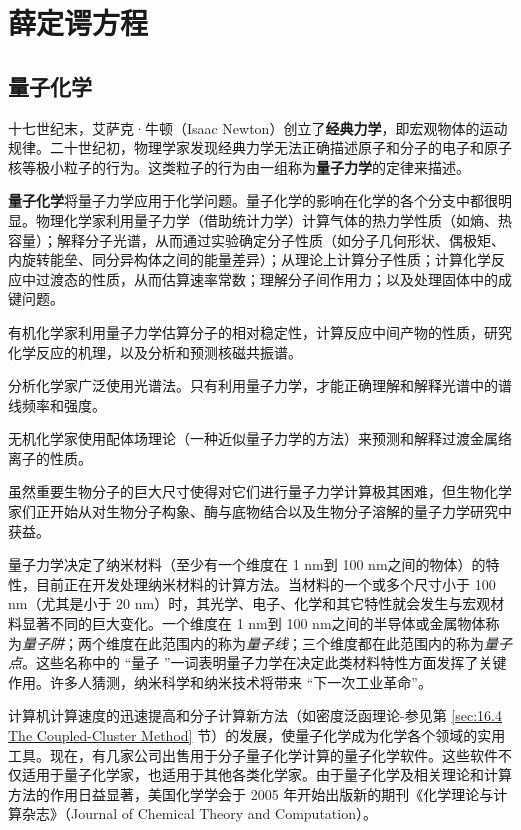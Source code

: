 \chapter{薛定谔方程}
\label{chap:1}

\section{量子化学}
\label{sec:1.1 Quantum Chemistry}
	十七世纪末，艾萨克·牛顿（Isaac Newton）创立了\textbf{经典力学}，即宏观物体的运动规律。二十世纪初，物理学家发现经典力学无法正确描述原子和分子的电子和原子核等极小粒子的行为。这类粒子的行为由一组称为\textbf{量子力学}的定律来描述。

	\textbf{量子化学}将量子力学应用于化学问题。量子化学的影响在化学的各个分支中都很明显。物理化学家利用量子力学（借助统计力学）计算气体的热力学性质（如熵、热容量）；解释分子光谱，从而通过实验确定分子性质（如分子几何形状、偶极矩、内旋转能垒、同分异构体之间的能量差异）；从理论上计算分子性质；计算化学反应中过渡态的性质，从而估算速率常数；理解分子间作用力；以及处理固体中的成键问题。

	有机化学家利用量子力学估算分子的相对稳定性，计算反应中间产物的性质，研究化学反应的机理，以及分析和预测核磁共振谱。
	
	分析化学家广泛使用光谱法。只有利用量子力学，才能正确理解和解释光谱中的谱线频率和强度。

	无机化学家使用配体场理论（一种近似量子力学的方法）来预测和解释过渡金属络离子的性质。

	虽然重要生物分子的巨大尺寸使得对它们进行量子力学计算极其困难，但生物化学家们正开始从对生物分子构象、酶与底物结合以及生物分子溶解的量子力学研究中获益。

	量子力学决定了纳米材料（至少有一个维度在 1 nm到 100 nm之间的物体）的特性，目前正在开发处理纳米材料的计算方法。当材料的一个或多个尺寸小于 100 nm（尤其是小于 20 nm）时，其光学、电子、化学和其它特性就会发生与宏观材料显著不同的巨大变化。一个维度在 1 nm到 100 nm之间的半导体或金属物体称为\textit{量子阱}；两个维度在此范围内的称为\textit{量子线}；三个维度都在此范围内的称为\textit{量子点}。这些名称中的 “量子 ”一词表明量子力学在决定此类材料特性方面发挥了关键作用。许多人猜测，纳米科学和纳米技术将带来 “下一次工业革命”。

	计算机计算速度的迅速提高和分子计算新方法（如密度泛函理论-参见第 \ref{sec:16.4 The Coupled-Cluster Method} 节）的发展，使量子化学成为化学各个领域的实用工具。现在，有几家公司出售用于分子量子化学计算的量子化学软件。这些软件不仅适用于量子化学家，也适用于其他各类化学家。由于量子化学及相关理论和计算方法的作用日益显著，美国化学学会于 2005 年开始出版新的期刊《化学理论与计算杂志》（Journal of Chemical Theory and Computation）。

